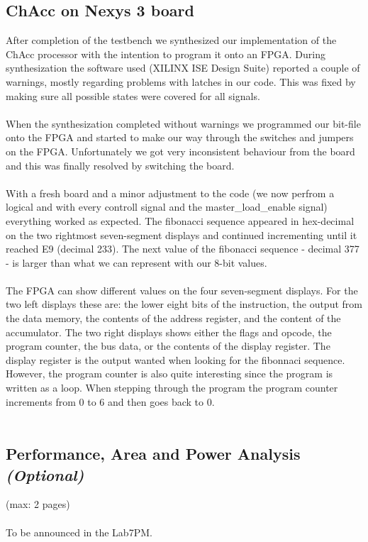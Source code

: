 \documentclass[a4paper,11pt]{article}
\begin{document}
\subsection{ChAcc on Nexys 3 board}
After completion of the testbench we synthesized our implementation of the 
ChAcc processor with the intention to program it onto an FPGA. During 
synthesization the software used (XILINX ISE Design Suite) reported a couple 
of warnings, mostly regarding problems with latches in our code. This was 
fixed by making sure all possible states were covered for all signals.\\\\
\noindent
When the synthesization completed without warnings we programmed our bit-file 
onto the FPGA and started to make our way through the switches and jumpers on 
the FPGA. Unfortunately we got very inconsistent behaviour from the board and 
this was finally resolved by switching the board.\\\\
\noindent
With a fresh board and a minor adjustment to the code (we now perfrom a 
logical and with every controll signal and the master\_load\_enable signal) 
everything worked as expected. The fibonacci sequence appeared in hex-decimal 
on the two rightmost seven-segment displays and continued incrementing until 
it reached E9 (decimal 233). The next value of the fibonacci sequence - 
decimal 377 - is larger than what we can represent with our 8-bit values.\\\\
\noindent
The FPGA can show different values on the four seven-segment displays. For 
the two left displays these are: the lower eight bits of the instruction, 
the output from the data memory, the contents of the address register, and 
the content of the accumulator. The two right displays shows either the 
flags and opcode, the program counter, the bus data, or the contents of the 
display register. The display register is the output wanted when looking for 
the fibonnaci sequence. However, the program counter is also quite interesting 
since the program is written as a loop. When stepping through the program 
the program counter increments from 0 to 6 and then goes back to 0.\\\\
\noindent

\subsection{Performance, Area and Power Analysis \emph{(Optional)}}
(max: 2 pages)
\\\\
To be announced in the Lab7PM.
\end{document}
